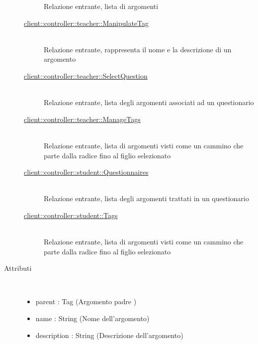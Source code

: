 \begin{description}
\begin{description}
 Relazione entrante, lista di argomenti  
\item[\hyperlink{client::controller::teacher::ManipulateTag}{client::controller::teacher::ManipulateTag}] \hfill \\
 Relazione entrante, rappresenta il nome e la descrizione di un argomento
\item[\hyperlink{client::controller::teacher::SelectQuestion}{client::controller::teacher::SelectQuestion}] \hfill \\
 Relazione entrante, lista degli argomenti associati ad un questionario
\item[\hyperlink{client::controller::teacher::ManageTags}{client::controller::teacher::ManageTags}] \hfill \\
 Relazione entrante, lista di argomenti visti come un cammino che parte dalla radice fino al figlio selezionato
\item[\hyperlink{client::controller::student::Questionnaires}{client::controller::student::Questionnaires}] \hfill \\
 Relazione entrante, lista degli argomenti trattati in un questionario
\item[\hyperlink{client::controller::student::Tags}{client::controller::student::Tags}] \hfill \\
 Relazione entrante, lista di argomenti visti come un cammino che parte dalla radice fino al figlio selezionato
\end{description}

\item[Attributi] \hfill \\
 \vspace{-7mm}
\begin{itemize}
\item parent : Tag (Argomento padre )
\item name : String (Nome dell'argomento)
\item description : String (Descrizione dell'argomento)
\end{itemize}

\end{description}

